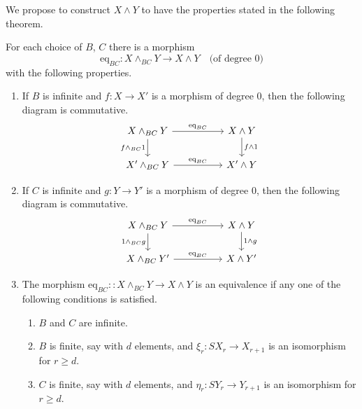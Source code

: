 \documentclass[../main]{subfiles}
\begin{document}
We propose to construct $X \wedge Y$ to have the properties stated in the following theorem.
\begin{theorem}\label{thm:p3ch04.2}
    For each choice of $B$, $C$ there is a morphism
    \[
        \mathrm{eq}_{BC} \colon X \wedge_{BC} Y \longrightarrow X \wedge Y \quad \text{(of degree 0)}
    \]
    with the following properties.
    \begin{enumerate}[label=(\roman*)] 
        \item If $B$ is infinite and $f \colon X \longrightarrow X'$ is a morphism of degree 0, then the following diagram is commutative.
            \[
            \begin{tikzcd}[column sep=5em] 
                X \wedge_{BC} Y & X \wedge Y \\
                X' \wedge_{BC} Y & X' \wedge Y
                \arrow[from=1-1, to=1-2, "\mathrm{eq}_{BC}"]
                \arrow[from=1-1, to=2-1, "f \wedge_{BC} 1"'] 
                \arrow[from=1-2, to=2-2, "f \wedge 1"]
                \arrow[from=2-1, to=2-2, "\mathrm{eq}_{BC}"] 
            \end{tikzcd}
            \]
        \item If $C$ is infinite and $g: Y \longrightarrow Y'$ is a morphism of degree 0, then the following diagram is commutative.
            \[
            \begin{tikzcd}[column sep=5em] 
                X \wedge_{BC} Y & X \wedge Y \\
                X \wedge_{BC} Y' & X \wedge Y'
                \arrow[from=1-1, to=1-2, "\mathrm{eq}_{BC}"]
                \arrow[from=1-1, to=2-1, "1 \wedge_{BC} g"'] 
                \arrow[from=1-2, to=2-2, "1 \wedge g"]
                \arrow[from=2-1, to=2-2, "\mathrm{eq}_{BC}"] 
            \end{tikzcd}
            \]
        \item The morphism $\mathrm{eq}_{BC} \colon: X \wedge_{BC} Y \longrightarrow X \wedge Y$ is an equivalence if any one of the following conditions is satisfied.
            \begin{enumerate}[label=(\alph*)] 
                \item $B$ and $C$ are infinite.
                \item $B$ is finite, say with $d$ elements, and $\xi_r \colon SX_r \longrightarrow X_{r+1}$ is an isomorphism for $r \geq d$.
                \item $C$ is finite, say with $d$ elements, and $\eta_r \colon SY_r \longrightarrow Y_{r+1}$ is an isomorphism for $r \geq d$.
            \end{enumerate}
    \end{enumerate}
\end{theorem}
\end{document}
